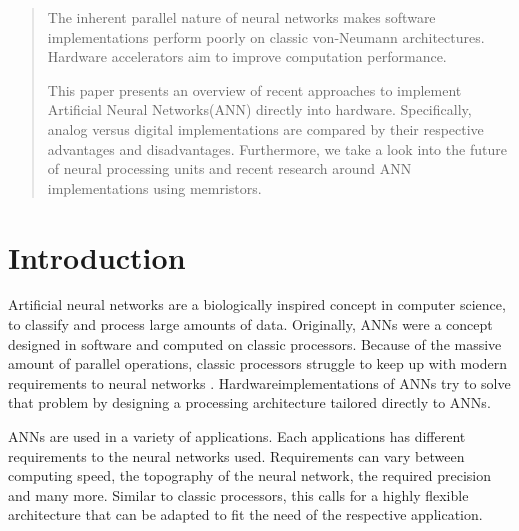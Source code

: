 \documentclass[conference]{IEEEtran}
\begin{document}
    \maketitle

    \begin{abstract}
        The inherent parallel nature of neural networks makes software implementations perform poorly on classic
        von-Neumann architectures.
        Hardware accelerators aim to improve computation performance.

        This paper presents an overview of recent approaches to implement Artificial Neural Networks(ANN) directly into hardware.
        Specifically, analog versus digital implementations are compared by their respective advantages and disadvantages.
        Furthermore, we take a look into the future of neural processing units and recent research around ANN implementations using memristors.
    \end{abstract}





    \IEEEpeerreviewmaketitle



    \section{Introduction}

    Artificial neural networks are a biologically inspired concept in computer science, to classify and process large amounts of data.
    Originally, ANNs were a concept designed in software and computed on classic processors.
    Because of the massive amount of parallel operations, classic processors struggle to keep up with modern requirements to neural networks \cite{forssell2014hardware}.
    Hardwareimplementations of ANNs try to solve that problem by designing a processing architecture tailored directly to ANNs.

    ANNs are used in a variety of applications.
    Each applications has different requirements to the neural networks used.
    Requirements can vary between computing speed, the topography of the neural network, the required precision and many more.
    Similar to classic processors, this calls for a highly flexible architecture that can be adapted to fit the need of the respective application.
\end{document}
